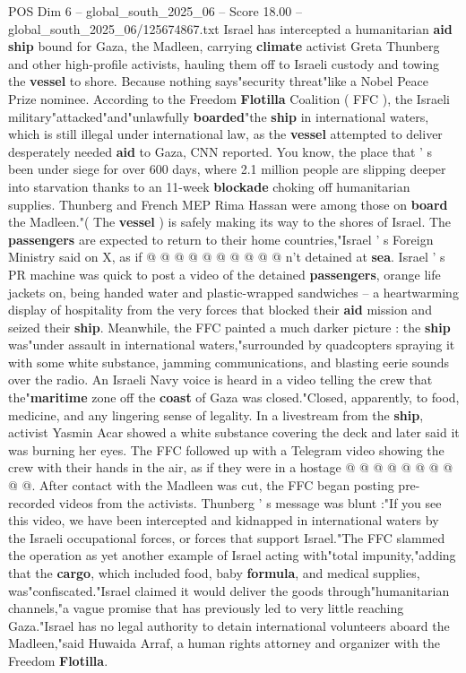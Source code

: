 \begin{textsample}{POS Dim 6 – global\_south\_2025\_06 – Score 18.00 – global\_south\_2025\_06/125674867.txt}  \label{ex:f6_pos_003}
Israel has intercepted a humanitarian \textbf{aid} \textbf{ship} bound for Gaza, the Madleen, carrying \textbf{climate} activist Greta Thunberg and other high-profile activists, hauling them off to Israeli custody and towing the \textbf{vessel} to shore.
Because nothing says"security threat"like a Nobel Peace Prize nominee.
According to the Freedom \textbf{Flotilla} Coalition ( FFC ), the Israeli military"attacked"and"unlawfully \textbf{boarded}"the \textbf{ship} in international waters, which is still illegal under international law, as the \textbf{vessel} attempted to deliver desperately needed \textbf{aid} to Gaza, CNN reported.
You know, the place that ' s been under siege for over 600 days, where 2.1 million people are slipping deeper into starvation thanks to an 11-week \textbf{blockade} choking off humanitarian supplies.
Thunberg and French MEP Rima Hassan were among those on \textbf{board} the Madleen."( The \textbf{vessel} ) is safely making its way to the shores of Israel.
The \textbf{passengers} are expected to return to their home countries,"Israel ' s Foreign Ministry said on X, as if @ @ @ @ @ @ @ @ @ @ n't detained at \textbf{sea}.
Israel ' s PR machine was quick to post a video of the detained \textbf{passengers}, orange life jackets on, being handed water and plastic-wrapped sandwiches -- a heartwarming display of hospitality from the very forces that blocked their \textbf{aid} mission and seized their \textbf{ship}.
Meanwhile, the FFC painted a much darker picture : the \textbf{ship} was"under assault in international waters,"surrounded by quadcopters spraying it with some white substance, jamming communications, and blasting eerie sounds over the radio.
An Israeli Navy voice is heard in a video telling the crew that the"\textbf{maritime} zone off the \textbf{coast} of Gaza was closed."Closed, apparently, to food, medicine, and any lingering sense of legality.
In a livestream from the \textbf{ship}, activist Yasmin Acar showed a white substance covering the deck and later said it was burning her eyes.
The FFC followed up with a Telegram video showing the crew with their hands in the air, as if they were in a hostage @ @ @ @ @ @ @ @ @ @.
After contact with the Madleen was cut, the FFC began posting pre-recorded videos from the activists.
Thunberg ' s message was blunt :"If you see this video, we have been intercepted and kidnapped in international waters by the Israeli occupational forces, or forces that support Israel."The FFC slammed the operation as yet another example of Israel acting with"total impunity,"adding that the \textbf{cargo}, which included food, baby \textbf{formula}, and medical supplies, was"confiscated."Israel claimed it would deliver the goods through"humanitarian channels,"a vague promise that has previously led to very little reaching Gaza."Israel has no legal authority to detain international volunteers aboard the Madleen,"said Huwaida Arraf, a human rights attorney and organizer with the Freedom \textbf{Flotilla}.

\end{textsample}
